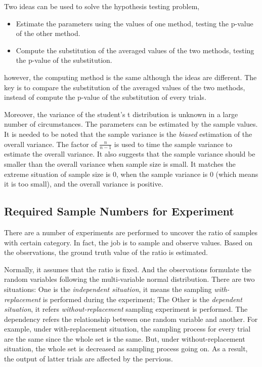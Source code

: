 Two ideas can be used to solve the hypothesis testing problem,
\begin{itemize}
    \item Estimate the parameters using the values of one method, testing the p-value of the other method.
    \item Compute the substitution of the averaged values of the two methods, testing the p-value of the substitution.
\end{itemize}
however, the computing method is the same although the ideas are different.
The key is to compare the substitution of the averaged values of the two methods,
instead of compute the p-value of the substitution of every trials.

Moreover, the variance of the student's t distribution is unknown in a large number of circumstances.
The parameters can be estimated by the sample values.
It is needed to be noted that the sample variance is the \emph{biased} estimation of the overall variance.
The factor of $\frac{n}{n-1}$ is used to time the sample variance to estimate the overall variance.
It also suggests that the sample variance should be smaller than the overall variance when sample size is small.
It matches the extreme situation of sample size is $0$,
when the sample variance is $0$ (which means it is too small), and the overall variance is positive.

\subsection{Required Sample Numbers for Experiment}

There are a number of experiments are performed to uncover the ratio of samples with certain category.
In fact, the job is to sample and observe values.
Based on the observations, the ground truth value of the ratio is estimated.

Normally, it assumes that the ratio is fixed.
And the observations formulate the random variables following the multi-variable normal distribution.
There are two situations:
One is the \emph{independent situation}, it means the sampling \emph{with-replacement} is performed during the experiment;
The Other is the \emph{dependent situation}, it refers \emph{without-replacement} sampling experiment is performed.
The dependency refers the relationship between one random variable and another.
For example, under with-replacement situation, the sampling process for every trial are the same since the whole set is the same.
But, under without-replacement situation, the whole set is decreased as sampling process going on.
As a result, the output of latter trials are affected by the pervious.

